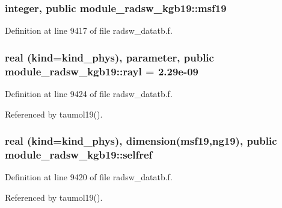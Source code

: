 \subsubsection[{\texorpdfstring{msf19}{msf19}}]{\setlength{\rightskip}{0pt plus 5cm}integer, public module\+\_\+radsw\+\_\+kgb19\+::msf19}\hypertarget{namespacemodule__radsw__kgb19_a86778b12ff439f4f83fda891e7ae2bfe}{}\label{namespacemodule__radsw__kgb19_a86778b12ff439f4f83fda891e7ae2bfe}


Definition at line 9417 of file radsw\+\_\+datatb.\+f.

\subsubsection[{\texorpdfstring{rayl}{rayl}}]{\setlength{\rightskip}{0pt plus 5cm}real (kind=kind\+\_\+phys), parameter, public module\+\_\+radsw\+\_\+kgb19\+::rayl = 2.\+29e-\/09}\hypertarget{namespacemodule__radsw__kgb19_ac79ad61e8d246d6075664df4201373d7}{}\label{namespacemodule__radsw__kgb19_ac79ad61e8d246d6075664df4201373d7}


Definition at line 9424 of file radsw\+\_\+datatb.\+f.



Referenced by taumol19().

\subsubsection[{\texorpdfstring{selfref}{selfref}}]{\setlength{\rightskip}{0pt plus 5cm}real (kind=kind\+\_\+phys), dimension({\bf msf19},ng19), public module\+\_\+radsw\+\_\+kgb19\+::selfref}\hypertarget{namespacemodule__radsw__kgb19_adb26cae00c05ac5c048a4db5a319a2eb}{}\label{namespacemodule__radsw__kgb19_adb26cae00c05ac5c048a4db5a319a2eb}


Definition at line 9420 of file radsw\+\_\+datatb.\+f.



Referenced by taumol19().

